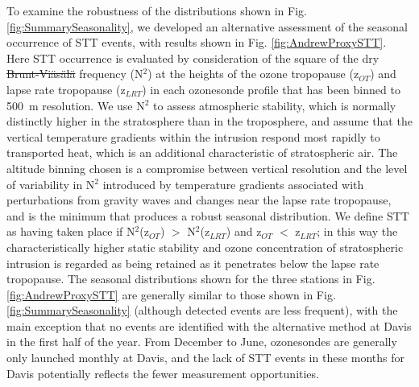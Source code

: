 \documentclass[acp, manuscript]{copernicus} %
\providecommand{\DIFadd}[1]{{\protect\color{blue}\uwave{#1}}} %
\providecommand{\DIFdel}[1]{{\protect\color{red}\sout{#1}}}                      %
\providecommand{\DIFaddbegin}{} %
\providecommand{\DIFaddend}{} %
\providecommand{\DIFdelbegin}{} %
\providecommand{\DIFdelend}{} %
\begin{document}
  \DIFaddend To examine the robustness of the distributions shown in Fig. \ref{fig:SummarySeasonality}, we developed an alternative assessment of the seasonal occurrence of STT events, with results shown in Fig. \ref{fig:AndrewProxySTT}.
  Here STT occurrence is evaluated by consideration of the square of the dry \DIFdelbegin \DIFdel{Brunt-Viäsälä }\DIFdelend \DIFaddbegin \DIFadd{Brunt-V\"{a}is\"{a}l\"{a} }\DIFaddend frequency (N$^2$) at the heights of the ozone tropopause (z$_{OT}$) and lapse rate tropopause (z$_{LRT}$) in each ozonesonde profile that has been binned to 500~m resolution.
  We use N$^2$ to assess atmospheric stability, which is normally distinctly higher in the stratosphere than in the troposphere, and assume that the vertical temperature gradients within the intrusion respond most rapidly to transported heat, which is an additional characteristic of stratospheric air.
  The altitude binning chosen is a compromise between vertical resolution and the level of variability in N$^2$ introduced by temperature gradients associated with perturbations from gravity waves and changes near the lapse rate tropopause, and is the minimum that produces a robust seasonal distribution.
  We define STT as having taken place if N$^2$(z$_{OT}$) $>$ N$^2$(z$_{LRT}$) and z$_{OT}$ $<$ z$_{LRT}$; in this way the characteristically higher static stability and ozone concentration of stratospheric intrusion is regarded as being retained as it penetrates below the lapse rate tropopause. 
  The seasonal distributions shown for the three stations in Fig. \ref{fig:AndrewProxySTT} are generally similar to those shown in Fig. \ref{fig:SummarySeasonality} (although detected events are less frequent), with the main exception that no events are identified with the alternative method at Davis in the first half of the year.
  From December to June, ozonesondes are generally only launched monthly at Davis, and the lack of STT events in these months for Davis potentially reflects the fewer measurement opportunities.
\end{document}
